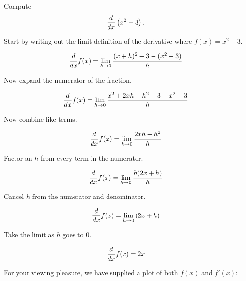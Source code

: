 \documentclass{ximera}
\begin{document}
\begin{example}
Compute 
\[
\frac{d}{dx} \left(x^2 - 3\right).
\]

Start by writing out the limit definition of the derivative where
$f(x) = x^2-3$.
\begin{freeResponse}[given]
\[
\frac{d}{dx} f(x) = \lim_{h\to 0}\frac{(x+h)^2 - 3 - (x^2 - 3)}{h}
\]
\end{freeResponse}
Now expand the numerator of the fraction.
\begin{freeResponse}[given]
\[
\frac{d}{dx} f(x) = \lim_{h\to 0}\frac{x^2 + 2xh + h^2 -3 - x^2 +3}{h}
\]
\end{freeResponse}
Now combine like-terms.
\begin{freeResponse}[given]
\[
\frac{d}{dx} f(x) = \lim_{h\to 0}\frac{2xh + h^2}{h}
\]
\end{freeResponse}
Factor an $h$ from every term in the numerator.
\begin{freeResponse}[given]
\[
\frac{d}{dx} f(x) = \lim_{h\to 0}\frac{h(2x + h)}{h}
\]
\end{freeResponse}
Cancel $h$ from the numerator and denominator.
\begin{freeResponse}[given]
\[
\frac{d}{dx} f(x) = \lim_{h\to 0} \left(2x + h\right)
\]
\end{freeResponse}
Take the limit as $h$ goes to $0$. 
\begin{freeResponse}[given]
\[
\frac{d}{dx} f(x) = 2x
\]
\end{freeResponse}
For your viewing pleasure, we have supplied a plot of both $f(x)$ and
$f'(x)$:
\begin{image}
\end{image}
\end{example}
\end{document}
